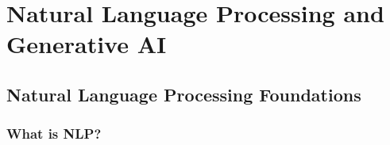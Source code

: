 \chapter{Natural Language Processing and Generative AI}

\section{Natural Language Processing Foundations}

\subsection{What is NLP?}

